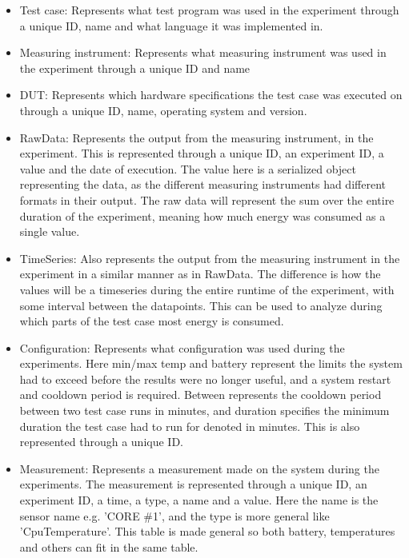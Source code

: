 \begin{itemize}
    \item Test case: Represents what test program was used in the experiment through a unique ID, name and what language it was implemented in.
    \item Measuring instrument: Represents what measuring instrument was used in the experiment through a unique ID and name
    \item DUT: Represents which hardware specifications the test case was executed on through a unique ID, name, operating system and version. 
    \item RawData: Represents the output from the measuring instrument, in the experiment. This is represented through a unique ID, an experiment ID, a value and the date of execution. The value here is a serialized object representing the data, as the different measuring instruments had different formats in their output. The raw data will represent the sum over the entire duration of the experiment, meaning how much energy was consumed as a single value.
    \item TimeSeries: Also represents the output from the measuring instrument in the experiment in a similar manner as in RawData. The difference is how the values will be a timeseries during the entire runtime of the experiment, with some interval between the datapoints. This can be used to analyze during which parts of the test case most energy is consumed.
    \item Configuration: Represents what configuration was used during the experiments. Here min/max temp and battery represent the limits the system had to exceed before the results were no longer useful, and a system restart and cooldown period is required. Between represents the cooldown period between two test case runs in minutes, and duration specifies the minimum duration the test case had to run for denoted in minutes. This is also represented through a unique ID.
    \item Measurement: Represents a measurement made on the system during the experiments. The measurement is represented through a unique ID, an experiment ID, a time, a type, a name and a value. Here the name is the sensor name e.g. 'CORE \#1', and the type is more general like 'CpuTemperature'. This table is made general so both battery, temperatures and others can fit in the same table.

\end{itemize}
